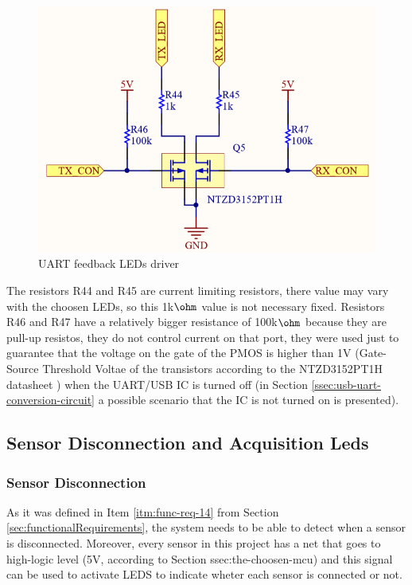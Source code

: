 		\begin{figure}[htbp]
			\centering
				\includegraphics[scale=1]{figuras/fig-leds-uart.png}
			\caption{UART feedback LEDs driver \cite{leds-uart}}
			\label{fig:leds-uart}
		\end{figure}

		The resistors R44 and R45 are current limiting resistors, there value may vary with the choosen LEDs, so this 1k$\ohm$ value is not necessary fixed. Resistors R46 and R47 have a relatively bigger resistance of 100k$\ohm$ because they are pull-up resistos, they do not control current on that port, they were used just to guarantee that the voltage on the gate of the PMOS is higher than 1V (Gate-Source Threshold Voltae of the transistors according to the NTZD3152PT1H datasheet \cite{ntzd3152pt1h-datasheet}) when the UART/USB IC is turned off (in Section \ref{ssec:usb-uart-conversion-circuit} a possible scenario that the IC is not turned on is presented).

	\subsection{Sensor Disconnection and Acquisition Leds}\label{ssec:sensor-disconnection-acquisition-leds}	

		\subsubsection{Sensor Disconnection}\label{sssec:sensor-disconnection-leds}

			As it was defined in Item \ref{itm:func-req-14} from Section \ref{sec:functionalRequirements}, the system needs to be able to detect when a sensor is disconnected. Moreover, every sensor in this project has a net that goes to high-logic level (5V, according to Section {ssec:the-choosen-mcu}) and this signal can be used to activate LEDS to indicate wheter each sensor is connected or not.

